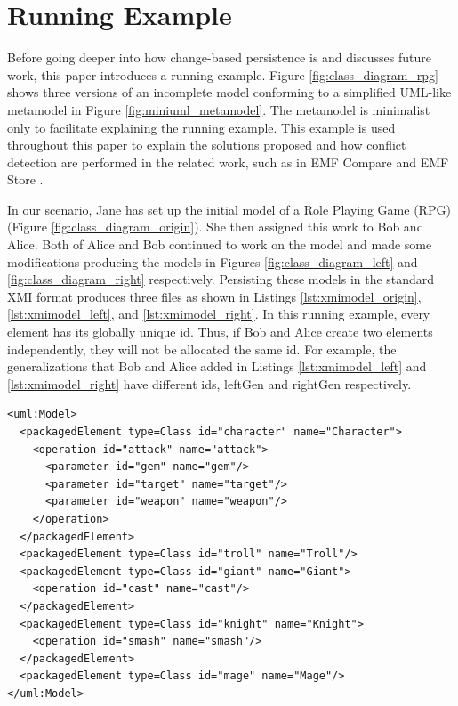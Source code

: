 \section{Running Example}
\label{sec:running_example}

Before going deeper into how change-based persistence is and discusses future work, this paper introduces a running example. Figure \ref{fig:class_diagram_rpg} shows three versions of an incomplete model conforming to a simplified UML-like metamodel in Figure \ref{fig:miniuml_metamodel}. The metamodel is minimalist only to facilitate explaining the running example. This example is used throughout this paper to explain the solutions proposed and how conflict detection are performed in the related work, such as in EMF Compare \cite{emfcompare2018developer} and EMF Store \cite{emfstore2019what}. 

In our scenario, Jane has set up the initial model of a Role Playing Game (RPG) (Figure \ref{fig:class_diagram_origin}). She then assigned this work to Bob and Alice. Both of Alice and Bob continued to work on the model and made some modifications producing the models in Figures \ref{fig:class_diagram_left} and \ref{fig:class_diagram_right} respectively. Persisting these models in the standard XMI \cite{omg2018xmi} format produces three files as shown in Listings \ref{lst:xmimodel_origin}, \ref{lst:xmimodel_left}, and \ref{lst:xmimodel_right}. In this running example, every element has its globally unique id. Thus, if Bob and Alice create two elements independently, they will not be allocated the same id. For example, the generalizations that Bob and Alice added in Listings \ref{lst:xmimodel_left} and \ref{lst:xmimodel_right} have different ids, \textsf{leftGen} and \textsf{rightGen} respectively.  

\vspace{-20pt}
\begin{lstlisting}[style=xmi,caption={Simplified XMI file of the original version in Figure \ref{fig:class_diagram_origin}.},label=lst:xmimodel_origin]
<uml:Model>
  <packagedElement type=Class id="character" name="Character">
    <operation id="attack" name="attack">
      <parameter id="gem" name="gem"/>
      <parameter id="target" name="target"/>
      <parameter id="weapon" name="weapon"/>
    </operation>
  </packagedElement>
  <packagedElement type=Class id="troll" name="Troll"/>
  <packagedElement type=Class id="giant" name="Giant">
    <operation id="cast" name="cast"/>
  </packagedElement>
  <packagedElement type=Class id="knight" name="Knight">
    <operation id="smash" name="smash"/>
  </packagedElement>
  <packagedElement type=Class id="mage" name="Mage"/>
</uml:Model>
\end{lstlisting}

